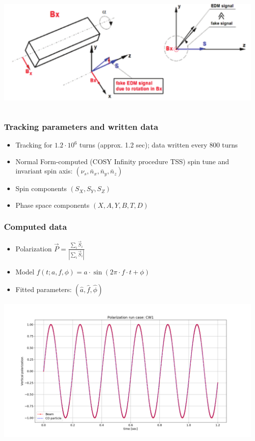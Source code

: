 \documentclass{beamer}
\begin{document}
\begin{frame}
\begin{columns}
\begin{column}{.5\textwidth}
\begin{center}
        \includegraphics[width=\linewidth]{magnet_tilting}
      \end{center}
    \end{column}
  \end{columns}
\end{frame}

\begin{frame}\frametitle{Tracking parameters and written data}
  \begin{itemize}
  \item Tracking for $1.2\cdot 10^6$ turns (approx. 1.2 sec); data written every 800 turns
  \item Normal Form-computed (COSY Infinity procedure TSS) spin tune and invariant spin axis: $(\nu_s, \bar n_x, \bar n_y, \bar n_z)$
  \item Spin components $(S_X, S_Y, S_Z)$
  \item Phase space components $(X, A, Y, B, T, D)$
  \end{itemize}
\end{frame}

\begin{frame}\frametitle{Computed data}
  \begin{itemize}
  \item Polarization $\vec P = \frac{\sum_i\vec S_i}{|\sum_i\vec S_i|}$
  \item Model  $f(t; a,f,\phi) = a\cdot \sin(2\pi\cdot f\cdot t + \phi)$
  \item Fitted parameters:  $(\hat a, \hat f, \hat\phi)$
  \end{itemize}
  \centering
  \includegraphics[width=\linewidth]{PY_plot}
\end{frame}
\end{document}
